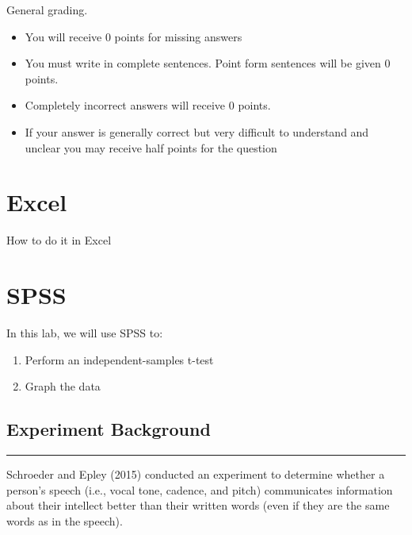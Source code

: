 \documentclass[]{book}
\providecommand{\tightlist}{%
  \setlength{\itemsep}{0pt}\setlength{\parskip}{0pt}}
\begin{document}
General grading.

\begin{itemize}
\tightlist
\item
  You will receive 0 points for missing answers
\item
  You must write in complete sentences. Point form sentences will be
  given 0 points.
\item
  Completely incorrect answers will receive 0 points.
\item
  If your answer is generally correct but very difficult to understand
  and unclear you may receive half points for the question
\end{itemize}

\section{Excel}\label{excel-7}

How to do it in Excel

\section{SPSS}\label{spss-7}

In this lab, we will use SPSS to:

\begin{enumerate}
\def\labelenumi{\arabic{enumi}.}
\tightlist
\item
  Perform an independent-samples t-test
\item
  Graph the data
\end{enumerate}

\subsection{Experiment Background}\label{experiment-background-2}

\begin{center}\rule{0.5\linewidth}{0.5pt}\end{center}

Schroeder and Epley (2015) conducted an experiment to determine whether
a person's speech (i.e., vocal tone, cadence, and pitch) communicates
information about their intellect better than their written words (even
if they are the same words as in the speech).
\end{document}
